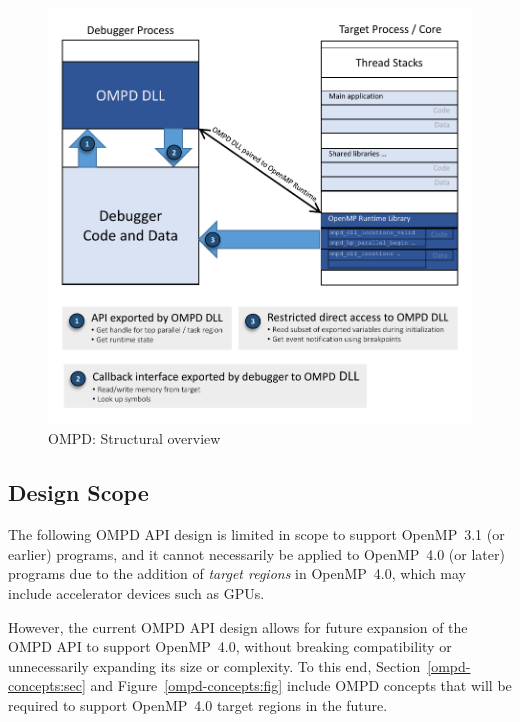 \begin{figure}
  \centering
    \includegraphics[width=6.0in,natwidth=424.8,natheight=417.6]{figures/ompd-structural-overview.pdf}
  \caption{OMPD: Structural overview}
\label{ompd-structural-overview:fig}
\end{figure}


\subsection{Design Scope}
\label{design-scope:sec}

The following OMPD API design is limited in scope to support
OpenMP~3.1 (or earlier) programs, and it cannot necessarily be applied
to OpenMP~4.0 (or later) programs due to the addition of \emph{target
regions} in OpenMP~4.0, which may include accelerator devices such as
GPUs.

However, the current OMPD API design allows for future
expansion of the OMPD API to support OpenMP~4.0, without breaking
compatibility or unnecessarily expanding its size or complexity.  To
this end, Section~\ref{ompd-concepts:sec} and
Figure~\ref{ompd-concepts:fig} include OMPD concepts that will be
required to support OpenMP~4.0 target regions in the future.
